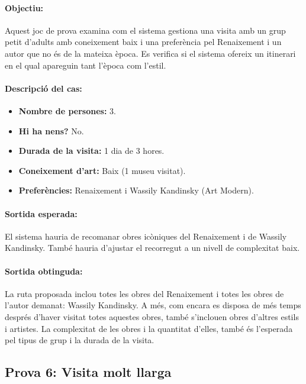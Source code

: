 \documentclass[a4paper]{article}
\begin{document}
	\paragraph{Objectiu:} 
	Aquest joc de prova examina com el sistema gestiona una visita amb un grup petit d’adults amb coneixement baix i una preferència pel Renaixement i un autor que no és de la mateixa època. Es verifica si el sistema ofereix un itinerari en el qual apareguin tant l'època com l'estil.
	
	\paragraph{Descripció del cas:} 
	
	\begin{itemize}
		\item \textbf{Nombre de persones:} 3.
		\item \textbf{Hi ha nens?} No.
		\item \textbf{Durada de la visita:} 1 dia de 3 hores.
		\item \textbf{Coneixement d’art:} Baix (1 museu visitat).
		\item \textbf{Preferències:} Renaixement i Wassily Kandinsky (Art Modern).
	\end{itemize}
	
	\paragraph{Sortida esperada:}
	El sistema hauria de recomanar obres icòniques del Renaixement i de Wassily Kandinsky. També hauria d’ajustar el recorregut a un nivell de complexitat baix.
	
	\paragraph{Sortida obtinguda:}
	La ruta proposada inclou totes les obres del Renaixement i totes les obres de l'autor demanat: Wassily Kandinsky. A més, com encara es disposa de més temps després d'haver visitat totes aquestes obres, també s'inclouen obres d'altres estils i artistes. La complexitat de les obres i la quantitat d'elles, també és l'esperada pel tipus de grup i la durada de la visita.
	
	\subsection{Prova 6: Visita molt llarga}
	
\end{document}
